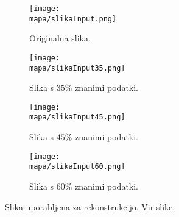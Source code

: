 \renewcommand{\mapa}{Poglavja/Slike/grayscale1000}

\begin{figure}[!ht]
    \centering
    \begin{subfigure}{0.49\linewidth}
        \texttt{[image: \\mapa/slikaInput.png]}
        \caption{Originalna slika.}
    \end{subfigure}
    \hfill
    \begin{subfigure}{0.49\linewidth}
        \texttt{[image: \\mapa/slikaInput35.png]}
        \caption{Slika s $35\%$ znanimi podatki.}
    \end{subfigure}
    \begin{subfigure}{0.49\linewidth}
        \texttt{[image: \\mapa/slikaInput45.png]}
        \caption{Slika s $45\%$ znanimi podatki.}
    \end{subfigure}
    \hfill
    \begin{subfigure}{0.49\linewidth}
        \texttt{[image: \\mapa/slikaInput60.png]}
        \caption{Slika s $60\%$ znanimi podatki.}
    \end{subfigure}
    \caption{Slika uporabljena za rekonstrukcijo. Vir slike: \cite{UnsplashGora}}
\end{figure}

